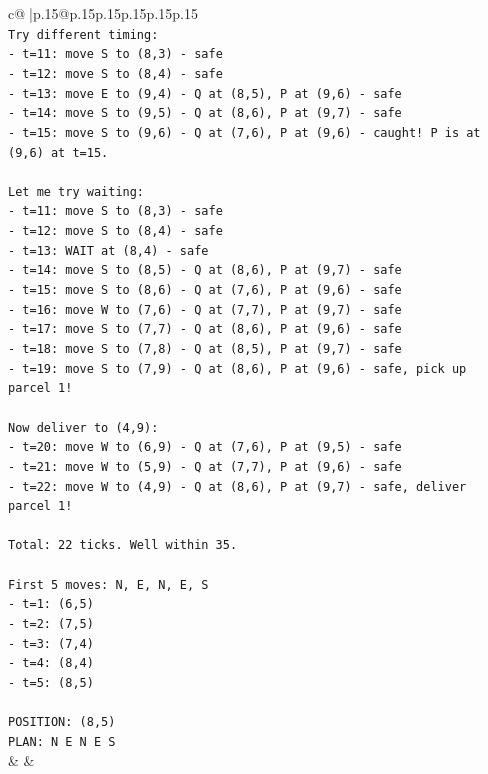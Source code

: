 \documentclass{article}
\begin{document}
{\begin{supertabular}{c@{$\;$}|p{.15\linewidth}@{}p{.15\linewidth}p{.15\linewidth}p{.15\linewidth}p{.15\linewidth}p{.15\linewidth}}
{{{\\ 
\texttt{Try different timing:} \\
\texttt{{-} t=11: move S to (8,3) {-} safe} \\
\texttt{{-} t=12: move S to (8,4) {-} safe} \\
\texttt{{-} t=13: move E to (9,4) {-} Q at (8,5), P at (9,6) {-} safe} \\
\texttt{{-} t=14: move S to (9,5) {-} Q at (8,6), P at (9,7) {-} safe} \\
\texttt{{-} t=15: move S to (9,6) {-} Q at (7,6), P at (9,6) {-} caught! P is at (9,6) at t=15.} \\
\\ 
\texttt{Let me try waiting:} \\
\texttt{{-} t=11: move S to (8,3) {-} safe} \\
\texttt{{-} t=12: move S to (8,4) {-} safe} \\
\texttt{{-} t=13: WAIT at (8,4) {-} safe} \\
\texttt{{-} t=14: move S to (8,5) {-} Q at (8,6), P at (9,7) {-} safe} \\
\texttt{{-} t=15: move S to (8,6) {-} Q at (7,6), P at (9,6) {-} safe} \\
\texttt{{-} t=16: move W to (7,6) {-} Q at (7,7), P at (9,7) {-} safe} \\
\texttt{{-} t=17: move S to (7,7) {-} Q at (8,6), P at (9,6) {-} safe} \\
\texttt{{-} t=18: move S to (7,8) {-} Q at (8,5), P at (9,7) {-} safe} \\
\texttt{{-} t=19: move S to (7,9) {-} Q at (8,6), P at (9,6) {-} safe, pick up parcel 1!} \\
\\ 
\texttt{Now deliver to (4,9):} \\
\texttt{{-} t=20: move W to (6,9) {-} Q at (7,6), P at (9,5) {-} safe} \\
\texttt{{-} t=21: move W to (5,9) {-} Q at (7,7), P at (9,6) {-} safe} \\
\texttt{{-} t=22: move W to (4,9) {-} Q at (8,6), P at (9,7) {-} safe, deliver parcel 1!} \\
\\ 
\texttt{Total: 22 ticks. Well within 35.} \\
\\ 
\texttt{First 5 moves: N, E, N, E, S} \\
\texttt{{-} t=1: (6,5)} \\
\texttt{{-} t=2: (7,5)} \\
\texttt{{-} t=3: (7,4)} \\
\texttt{{-} t=4: (8,4)} \\
\texttt{{-} t=5: (8,5)} \\
\\ 
\texttt{POSITION: (8,5)} \\
\texttt{PLAN: N E N E S} \\
            }
        }
    }
    & & \\ \\


\end{supertabular}}
\end{document}

